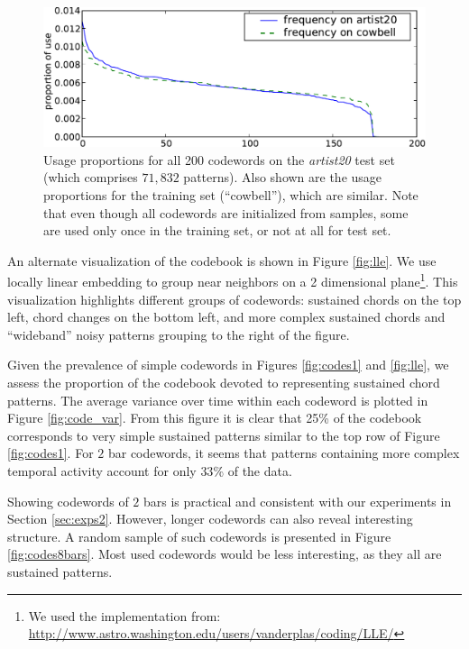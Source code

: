 \documentclass{article}
\begin{document}
\begin{figure}[bt]
\begin{center}
\includegraphics[width=.99\columnwidth]{freqs}
\end{center}
\caption{\small{Usage proportions for all 200 codewords 
on the {\it artist20} test set (which comprises $71,832$
patterns).  Also shown are the usage proportions for the training set (``cowbell''), 
which are similar.
Note that even though all codewords are initialized from samples, some
are used only once in the training set, or not at all for test set.
}}
\label{fig:freqs}
\end{figure}

An alternate visualization of the codebook is shown in Figure
\ref{fig:lle}.  We use locally linear embedding \cite{Roweis2000} to
group near neighbors on a 2 dimensional plane\footnote{We used the
  implementation from:
  \url{http://www.astro.washington.edu/users/vanderplas/coding/LLE/}}.
This visualization highlights different groups of codewords: sustained
chords on the top left, chord changes on the bottom left, and more
complex sustained chords and ``wideband'' noisy patterns grouping to
the right of the figure.

Given the prevalence of simple codewords in Figures \ref{fig:codes1}
and \ref{fig:lle}, we assess the proportion of the codebook devoted to
representing sustained chord patterns.  The average variance over time
within each codeword is plotted in Figure \ref{fig:code_var}.  From
this figure it is clear that 25\% of the codebook corresponds to very
simple sustained patterns similar to the top row of Figure
\ref{fig:codes1}. For $2$ bar codewords, it seems that patterns
containing more complex temporal activity account for only $33$\% of
the data.

Showing codewords of $2$ bars is practical and consistent with our experiments
in Section \ref{sec:exps2}. However, longer codewords can also reveal
interesting structure. A random sample of such codewords is presented
in Figure \ref{fig:codes8bars}. Most used codewords would be less interesting,
as they all are sustained patterns.
\end{document}
